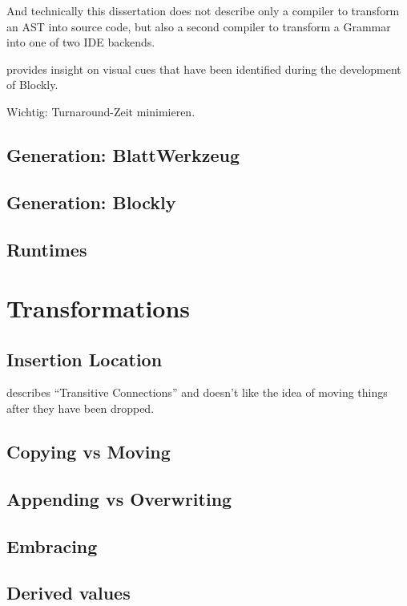 And technically this dissertation does not describe only a compiler to transform an AST into source code, but also a second compiler to transform a Grammar into one of two IDE backends.

\cite{fraser_ten_2015} provides insight on visual cues that have been identified during the development of Blockly.

Wichtig: Turnaround-Zeit minimieren.

\subsection{Generation: BlattWerkzeug}

\subsection{Generation: Blockly}

\subsection{Runtimes}

\section{Transformations}

\subsection{Insertion Location}

\cite{fraser_ten_2015} describes \enquote{Transitive Connections} and doesn't like the idea of moving things after they have been dropped.

\subsection{Copying vs Moving}

\subsection{Appending vs Overwriting}

\subsection{Embracing}

\subsection{Derived values}


